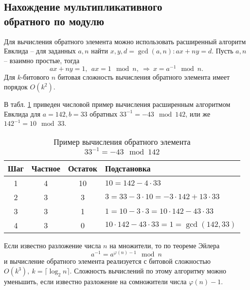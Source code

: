 \subsection[Нахождение мультипликативного обратного]{Нахождение мультипликативного \protect\\ обратного по модулю}

Для вычисления обратного элемента можно использовать расширенный алгоритм Евклида -- для заданных $a, n$ найти $x, y, d = \gcd(a,n): ax + ny = d$. Пусть $a,n$ -- взаимно простые, тогда
    \[ ax + ny = 1, ~~ ax = 1 \mod n, ~ \Rightarrow ~ x = a^{-1} \mod n. \]
Для $k$-битового $n$ битовая сложность вычисления обратного элемента имеет порядок $O(k^2)$.

\example
В табл. \ref{tab:extended-euclid-inverse} приведен числовой пример вычисления расширенным алгоритмом Евклида для $a=142, b=33$ обратных $33^{-1} = -43 \mod 142$, или же $142^{-1} = 10 \mod 33$.

\begin{table}[h!]
    \centering
    \caption{Пример вычисления обратного элемента \\ $33^{-1}  = -43 \mod 142$\label{tab:extended-euclid-inverse}}
    \begin{tabular}{|c|c|c|l|}
        \hline
        Шаг & Частное & Остаток & Подстановка \\
        \hline
        1 & 4 & 10 & $10 = 142 - 4 \cdot 33$ \\
        2 & 3 & 3  & $3 = 33 - 3 \cdot 10 = -3 \cdot 142 + 13 \cdot 33$ \\
        3 & 3 & 1  & $1 = 10 - 3 \cdot 3 = 10 \cdot 142 - 43 \cdot 33$ \\
        4 & 3 & 0  & $10 \cdot 142 - 43 \cdot 33 = 1 = \gcd(142,33)$ \\
        \hline
    \end{tabular}
\end{table}
\exampleend

Если известно разложение числа $n$ на множители, то по теореме Эйлера
    \[ a^{-1} = a^{\varphi(n) - 1} \mod n \]
и вычисление обратного элемента реализуется с битовой сложностью $O(k^3),~ k = \lceil \log_2 n \rceil$. Сложность вычислений по этому алгоритму можно уменьшить, если известно разложение на сомножители числа $\varphi(n) - 1$.
